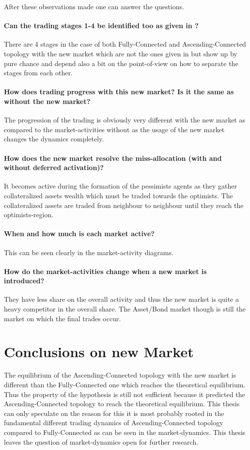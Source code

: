 \documentclass[Bachelorarbeit.tex]{subfiles}
\begin{document}
After these observations made one can answer the questions.

\paragraph{Can the trading stages 1-4 be identified too as given in \cite{Breuer2015}?}
There are 4 stages in the case of both Fully-Connected and Ascending-Connected topology with the new market which are not the ones given in \cite{Breuer2015} but show up by pure chance and depend also a bit on the point-of-view on how to separate the stages from each other. 

\paragraph{How does trading progress with this new market? Is it the same as without the new market?}
The progression of the trading is obviously very different with the new market as compared to the market-activities without as the usage of the new market changes the dynamics completely.

\paragraph{How does the new market resolve the miss-allocation (with and without deferred activation)?}
It becomes active during the formation of the pessimists agents as they gather collateralized assets wealth which must be traded towards the optimists. The collateralized assets are traded from neighbour to neighbour until they reach the optimists-region.

\paragraph{When and how much is each market active?}
This can be seen clearly in the market-activity diagrams.

\paragraph{How do the market-activities change when a new market is introduced?}
They have less share on the overall activity and thus the new market is quite a heavy competitor in the overall share. The Asset/Bond market though is still the market on which the final trades occur.

\section{Conclusions on new Market}
The equilibrium of the Ascending-Connected topology with the new market is different than the Fully-Connected one which reaches the theoretical equilibrium. Thus the property of the hypothesis is still not sufficient because it predicted the Ascending-Connected topology to reach the theoretical equilibrium. This thesis can only speculate on the reason for this it is most probably rooted in the fundamental different trading dynamics of Ascending-Connected topology compared to Fully-Connected as can be seen in the market-dynamics. This thesis leaves the question of market-dynamics open for further research.
\end{document}
